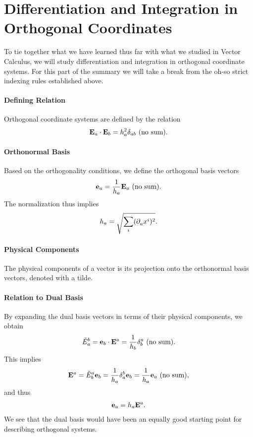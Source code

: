 \section{Differentiation and Integration in Orthogonal Coordinates}

To tie together what we have learned thus far with what we studied in Vector Calculus, we will study differentiation and integration in orthogonal coordinate systems. For this part of the summary we will take a break from the oh-so strict indexing rules established above.

\paragraph{Defining Relation}
Orthogonal coordinate systems are defined by the relation
\begin{align*}
	\vb{E}_{a}\cdot\vb{E}_{b} = h_{a}^{2}\delta_{ab}\ \text{(no sum)} .
\end{align*}

\paragraph{Orthonormal Basis}
Based on the orthogonality conditions, we define the orthogonal basis vectors
\begin{align*}
	\vb{e}_{a} = \frac{1}{h_{a}}\vb{E}_{a}\ \text{(no sum)} .
\end{align*}
The normalization thus implies
\begin{align*}
	h_{a} = \sqrt{\sum\limits_{i}(\partial^{}_{a}x^{i})^{2}}.
\end{align*}

\paragraph{Physical Components}
The physical components of a vector is its projection onto the orthonormal basis vectors, denoted with a tilde.

\paragraph{Relation to Dual Basis}
By expanding the dual basis vectors in terms of their physical components, we obtain
\begin{align*}
	\tilde{E}_{a}^{b} = \vb{e}_{b}\cdot\vb{E}^{a} = \frac{1}{h_{b}}\delta_{b}^{a}\ \text{(no sum)} .
\end{align*}
This implies
\begin{align*}
	\vb{E}^{a} = \tilde{E}_{b}^{a}\vb{e}_{b} = \frac{1}{h_{a}}\delta_{a}^{b}\vb{e}_{b} = \frac{1}{h_{a}}\vb{e}_{a}\ \text{(no sum)} ,
\end{align*}
and thus
\begin{align*}
	\vb{e}_{a} = h_{a}\vb{E}^{a}.
\end{align*}
We see that the dual basis would have been an equally good starting point for describing orthogonal systems.

